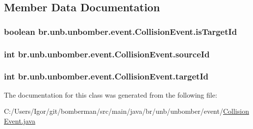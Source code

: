 \subsection{Member Data Documentation}
\hypertarget{classbr_1_1unb_1_1unbomber_1_1event_1_1_collision_event_a84a28b5d5ed39f6de13ab961f8fc6a84}{
\subsubsection[{is\+Target\+Id}]{\setlength{\rightskip}{0pt plus 5cm}boolean br.\+unb.\+unbomber.\+event.\+Collision\+Event.\+is\+Target\+Id\hspace{0.3cm}{\ttfamily [private]}}}\label{classbr_1_1unb_1_1unbomber_1_1event_1_1_collision_event_a84a28b5d5ed39f6de13ab961f8fc6a84}
\hypertarget{classbr_1_1unb_1_1unbomber_1_1event_1_1_collision_event_a3115ab5eb686ecea5e7629e6fbb02be4}{
\subsubsection[{source\+Id}]{\setlength{\rightskip}{0pt plus 5cm}int br.\+unb.\+unbomber.\+event.\+Collision\+Event.\+source\+Id\hspace{0.3cm}{\ttfamily [private]}}}\label{classbr_1_1unb_1_1unbomber_1_1event_1_1_collision_event_a3115ab5eb686ecea5e7629e6fbb02be4}
\hypertarget{classbr_1_1unb_1_1unbomber_1_1event_1_1_collision_event_a3b46d8cfa814478929fb264594f4c1eb}{
\subsubsection[{target\+Id}]{\setlength{\rightskip}{0pt plus 5cm}int br.\+unb.\+unbomber.\+event.\+Collision\+Event.\+target\+Id\hspace{0.3cm}{\ttfamily [private]}}}\label{classbr_1_1unb_1_1unbomber_1_1event_1_1_collision_event_a3b46d8cfa814478929fb264594f4c1eb}


The documentation for this class was generated from the following file\+:\begin{DoxyCompactItemize}
\item 
C\+:/\+Users/\+Igor/git/bomberman/src/main/java/br/unb/unbomber/event/\hyperlink{_collision_event_8java}{Collision\+Event.\+java}\end{DoxyCompactItemize}
